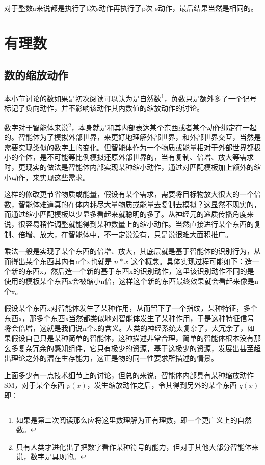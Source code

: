 \documentclass[12pt,oneside]{book}
\begin{document}
对于整数a来说都是执行了t次s动作再执行了p次-s动作，最后结果当然是相同的。


\chapter{有理数}
\section{数的缩放动作}
本小节讨论的数如果是初次阅读可以认为是自然数\footnote{如果是第二次阅读那么应将这里数理解为正有理数，即一个更广义上的自然数。}，负数只是额外多了一个记号标记了负向动作，并不影响该动作其内数值的缩放动作的讨论。

数字对于智能体来说\footnote{只有人类才进化出了把数字看作某种符号的能力，但对于其他大部分智能体来说，数字是具现的。}，本身就是和其内部表达某个东西或者某个动作绑定在一起的。智能体为了模拟外部世界，来更好地理解外部世界，和外部世界交互，当然是需要实现类似的数字上的变化。但智能体作为一个物质或能量相对于外部世界都极小的个体，是不可能等比例模拟还原外部世界的，当有复制、倍增、放大等需求时，更现实的做法是智能体内部实现某种缩小动作，通过对匹配模板加上额外的缩小动作，来实现这些需求。

这样的修改更节省物质或能量，假设有某个需求，需要将目标物放大很大的一个倍数，智能体难道真的在体内耗尽大量物质或能量去复制去模拟？这显然不现实的，而通过缩小匹配模板以少显多看起来就聪明的多了。从神经元的递质传播角度来说，很容易稍作调整就能得到某种数量上的缩小动作。当然直接进行某个东西的复制、倍增、放大，在智能体中，不一定说没有，只是说很难大面积推广。

乘法一般是实现了某个东西的倍增、放大，其底层就是基于智能体的识别行为，从而得出某个东西其内有n个x也就是 $n*x$ 这个概念。具体实现过程可能如下：造一个新的东西x，然后造一个新的基于东西x的识别动作，这里该识别动作不同的是使用的模板某个东西x会被缩小n倍，这样这个新的东西最终效果就会看起来像是n个x。

假设某个东西x对智能体发生了某种作用，从而留下了一个指纹，某种特征，多个东西x，那多个东西x当然都类似地对智能体发生了某种作用，于是这种特征信号将会倍增，这就是我们说n个x的含义。人类的神经系统太复杂了，太冗余了，如果假设自己只是某种简单的智能体，这种描述非常合理，简单的智能体根本没有那么多复杂冗余的感知组件，它只有极少的资源，基于这极少的资源，发展出甚至超出理论之外的潜在生存能力，这正是物的同一性要求所描述的情景。

上面多少有一点技术细节上的讨论，但总的来说，智能体内部具有某种缩放动作SM，对于某个东西 $p(x)$，发生缩放动作之后，令其得到另外的某个东西 $q(x)$ 即：
\end{document}
